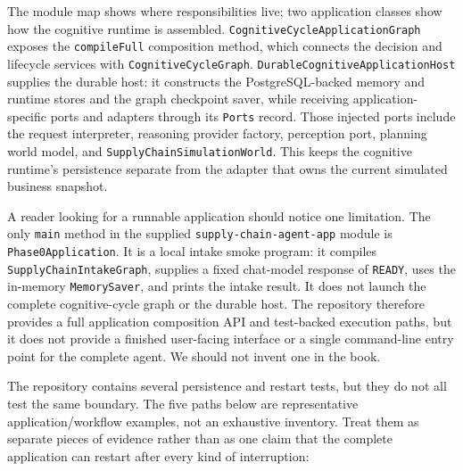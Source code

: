 The module map shows where responsibilities live; two application classes show how the cognitive runtime is assembled. \texttt{CognitiveCycleApplicationGraph} exposes the \texttt{compileFull} composition method, which connects the decision and lifecycle services with \texttt{CognitiveCycle\allowbreak{}Graph}. \texttt{DurableCognitive\allowbreak{}ApplicationHost} supplies the durable host: it constructs the PostgreSQL-backed memory and runtime stores and the graph checkpoint saver, while receiving application-specific ports and adapters through its \texttt{Ports} record. Those injected ports include the request interpreter, reasoning provider factory, perception port, planning world model, and \texttt{SupplyChain\allowbreak{}SimulationWorld}. This keeps the cognitive runtime's persistence separate from the adapter that owns the current simulated business snapshot.

A reader looking for a runnable application should notice one limitation. The only \texttt{main} method in the supplied \texttt{supply-chain-agent-app} module is \texttt{Phase0Application}. It is a local intake smoke program: it compiles \texttt{SupplyChainIntakeGraph}, supplies a fixed chat-model response of \texttt{READY}, uses the in-memory \texttt{MemorySaver}, and prints the intake result. It does not launch the complete cognitive-cycle graph or the durable host. The repository therefore provides a full application composition API and test-backed execution paths, but it does not provide a finished user-facing interface or a single command-line entry point for the complete agent. We should not invent one in the book.

The repository contains several persistence and restart tests, but they do not all test the same boundary. The five paths below are representative application/workflow examples, not an exhaustive inventory. Treat them as separate pieces of evidence rather than as one claim that the complete application can restart after every kind of interruption:

